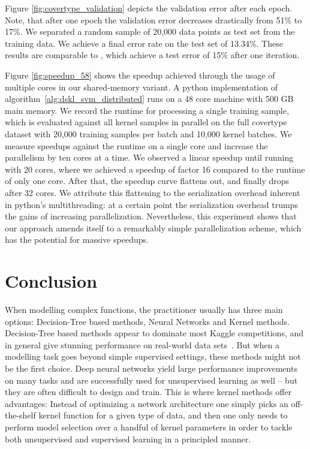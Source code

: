 \documentclass{article} %
\begin{document}
Figure \ref{fig:covertype_validation} depicts the validation error after each epoch. Note, that after one epoch the validation error decreases drastically from 51\% to 17\%. We separated a random sample of 20,000 data points as test set from the training data. We achieve a final error rate on the test set of 13.34\%. 
These results are comparable to \cite{Dai2014}, which achieve a test error of 15\% after one iteration. 

Figure \ref{fig:speedup_58} shows the speedup achieved through the usage of multiple cores in our shared-memory variant. A python implementation of algorithm~\autoref{alg:dskl_svm_distributed} runs on a 48 core machine with 500 GB main memory. We record the runtime for processing a single training sample, which is evaluated against all kernel samples in parallel on the full covertype dataset with 20,000 training samples per batch and 10,000 kernel batches. We measure speedups against the runtime on a single core and increase the parallelism by ten cores at a time. We observed a linear speedup until running with 20 cores, where we achieved a speedup of factor 16 compared to the runtime of only one core. After that, the speedup curve flattens out, and finally drops after 32 cores. We attribute this flattening to the serialization overhead inherent in python's multithreading: at a certain point the serialization overhead trumps the gains of increasing parallelization. Nevertheless, this experiment shows that our approach amends itself to a remarkably simple parallelization scheme, which has the potential for massive speedups.

\section{Conclusion}
When modelling complex functions, the practitioner usually has three main options: Decision-Tree based methods, Neural Networks and Kernel methods. Decision-Tree based methods appear to dominate most Kaggle competitions, and in general give stunning performance on real-world data sets~\cite{Caruana2006}. But when a modelling task goes beyond simple supervised settings, these methods might not be the first choice. Deep neural networks yield large performance improvements on many tasks and are successfully used for unsupervised learning as well -- but they are often difficult to design and train. 
This is where kernel methods offer advantages: Instead of optimizing a network architecture one simply picks an off-the-shelf kernel function for a given type of data, and then one only needs to perform model selection over a handful of kernel parameters in order to tackle both unsupervised and supervised learning in a principled manner.
\end{document}
